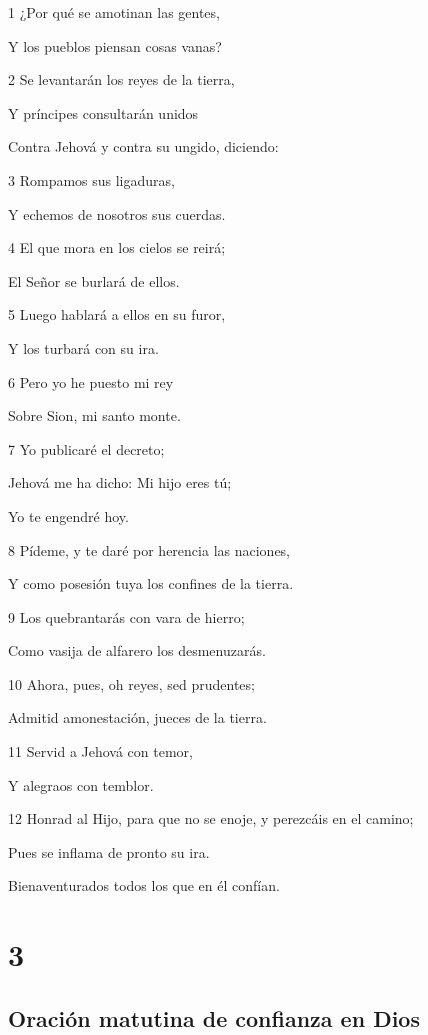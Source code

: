 \par 1 ¿Por qué se amotinan las gentes,
\par Y los pueblos piensan cosas vanas?
\par 2 Se levantarán los reyes de la tierra,
\par Y príncipes consultarán unidos
\par Contra Jehová y contra su ungido, diciendo:
\par 3 Rompamos sus ligaduras,
\par Y echemos de nosotros sus cuerdas.
\par 4 El que mora en los cielos se reirá;
\par El Señor se burlará de ellos.
\par 5 Luego hablará a ellos en su furor,
\par Y los turbará con su ira.
\par 6 Pero yo he puesto mi rey
\par Sobre Sion, mi santo monte.
\par 7 Yo publicaré el decreto;
\par Jehová me ha dicho: Mi hijo eres tú;
\par Yo te engendré hoy.
\par 8 Pídeme, y te daré por herencia las naciones,
\par Y como posesión tuya los confines de la tierra.
\par 9 Los quebrantarás con vara de hierro;
\par Como vasija de alfarero los desmenuzarás.
\par 10 Ahora, pues, oh reyes, sed prudentes;
\par Admitid amonestación, jueces de la tierra.
\par 11 Servid a Jehová con temor,
\par Y alegraos con temblor.
\par 12 Honrad al Hijo, para que no se enoje, y perezcáis en el camino;
\par Pues se inflama de pronto su ira.
\par Bienaventurados todos los que en él confían.

\chapter{3}

\section*{Oración matutina de confianza en Dios}

